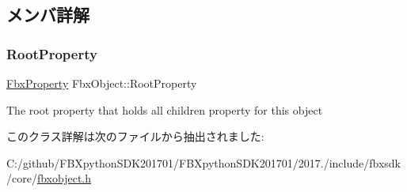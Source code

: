 \subsection{メンバ詳解}
\mbox{\label{class_fbx_object_a865ee4dfaa7a8f9050105d4477288da8}} 
\subsubsection{\texorpdfstring{Root\+Property}{RootProperty}}
{\footnotesize\ttfamily \hyperlink{class_fbx_property}{Fbx\+Property} Fbx\+Object\+::\+Root\+Property}



The root property that holds all children property for this object 



このクラス詳解は次のファイルから抽出されました\+:\begin{DoxyCompactItemize}
\item 
C\+:/github/\+F\+B\+Xpython\+S\+D\+K201701/\+F\+B\+Xpython\+S\+D\+K201701/2017./include/fbxsdk/core/\hyperlink{fbxobject_8h}{fbxobject.\+h}\end{DoxyCompactItemize}
